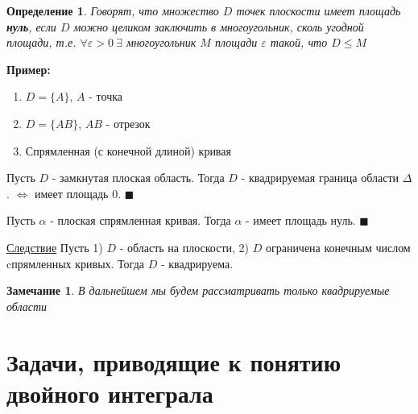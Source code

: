 \documentclass[a4paper, 14pt]{report}
\newtheorem{defenition}{Определение}[chapter]
\newtheorem{note}{Замечание}[chapter]
\begin{document}
\hfill

\begin{defenition}
    Говорят, что множество $D$ точек плоскости имеет площадь \textbf{нуль}, если $D$ можно целиком заключить в многоугольник, сколь угодной площади, т.е. $\forall \varepsilon > 0\ \exists$ многоугольник $M$ площади $\varepsilon$ такой, что $D \le M$
\end{defenition}

\hfill

\textbf{Пример:}
\begin{enumerate}
    \item[1)] $D = \{ A \}$, $A$ - точка
    \item[2)] $D = \{ AB \}$, $AB$ - отрезок
    \item[3)] Спрямленная (с конечной длиной) кривая
\end{enumerate}

\begin{theorem}
    Пусть $D$ - замкнутая плоская область. Тогда $D$ - квадрируемая граница области $\Delta$. $\Leftrightarrow$ имеет площадь 0. $\blacksquare$
\end{theorem}

\hfill

\begin{theorem}
    Пусть $\alpha$ - плоская спрямленная кривая. Тогда $\alpha$ - имеет площадь нуль. $\blacksquare$
\end{theorem}

\hfill

\underline{Следствие} Пусть 1) $D$ - область на плоскости, 2) $D$ ограничена конечным числом cпрямленных кривых. Тогда $D$ - квадрируема.

\hfill

\begin{note}
    В дальнейшем мы будем рассматривать только квадрируемые области
\end{note}

\section{Задачи, приводящие к понятию двойного интеграла}
\end{document}
